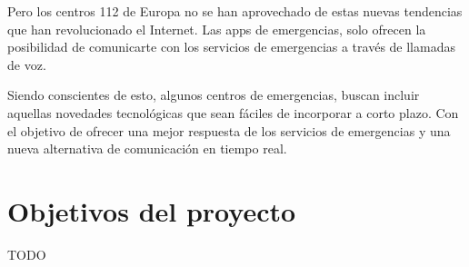 Pero los centros 112 de Europa no se han aprovechado de estas nuevas tendencias que han revolucionado el Internet. Las apps de emergencias, solo ofrecen la posibilidad de comunicarte con los servicios de emergencias a través de llamadas de voz.

Siendo conscientes de esto, algunos centros de emergencias, buscan incluir aquellas novedades tecnológicas que sean fáciles de incorporar a corto plazo. Con el objetivo de ofrecer una mejor respuesta de los servicios de emergencias y una nueva alternativa de comunicación en tiempo real.

\clearpage

\section{Objetivos del proyecto}

TODO
